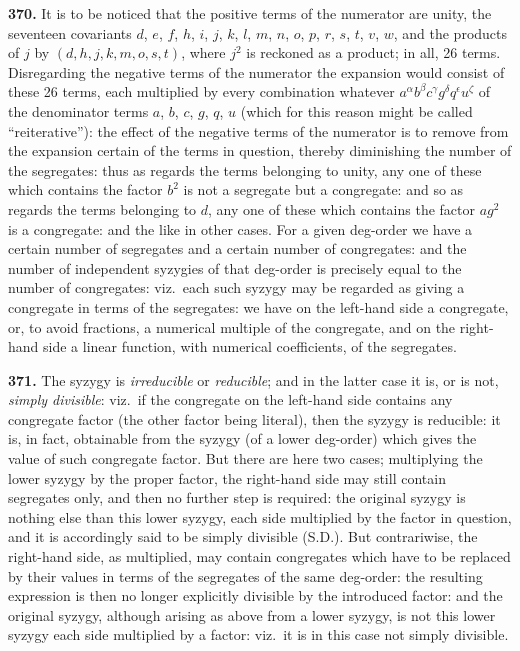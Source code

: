 \documentclass[11pt,a4paper]{book}
\begin{document}
\medskip

\noindent\textbf{370.} It is to be noticed that the positive terms of the numerator are unity, the seventeen covariants $d$, $e$, $f$, $h$, $i$, $j$, $k$, $l$, $m$, $n$, $o$, $p$, $r$, $s$, $t$, $v$, $w$, and the products of $j$ by $(d, h, j, k, m, o, s, t)$, where $j^2$ is reckoned as a product; in all, 26 terms. Disregarding the negative terms of the numerator the expansion would consist of these 26 terms, each multiplied by every combination whatever $a^\alpha b^\beta c^\gamma g^\delta q^\epsilon u^\zeta$ of the denominator terms $a$, $b$, $c$, $g$, $q$, $u$ (which for this reason might be called ``reiterative''): the effect of the negative terms of the numerator is to remove from the expansion certain of the terms in question, thereby diminishing the number of the segregates: thus as regards the terms belonging to unity, any one of these which contains the factor $b^2$ is not a segregate but a congregate: and so as regards the terms belonging to $d$, any one of these which contains the factor $ag^2$ is a congregate: and the like in other cases. For a given deg-order we have a certain number of segregates and a certain number of congregates: and the number of independent syzygies of that deg-order is precisely equal to the number of congregates: viz.\ each such syzygy may be regarded as giving a congregate in terms of the segregates: we have on the left-hand side a congregate, or, to avoid fractions, a numerical multiple of the congregate, and on the right-hand side a linear function, with numerical coefficients, of the segregates.

\medskip

\noindent\textbf{371.} The syzygy is \textit{irreducible} or \textit{reducible}; and in the latter case it is, or is not, \textit{simply divisible}: viz.\ if the congregate on the left-hand side contains any congregate factor (the other factor being literal), then the syzygy is reducible: it is, in fact, obtainable from the syzygy (of a lower deg-order) which gives the value of such congregate factor. But there are here two cases; multiplying the lower syzygy by the proper factor, the right-hand side may still contain segregates only, and then no further step is required: the original syzygy is nothing else than this lower syzygy, each side multiplied by the factor in question, and it is accordingly said to be simply divisible (S.D.). But contrariwise, the right-hand side, as multiplied, may contain congregates which have to be replaced by their values in terms of the segregates of the same deg-order: the resulting expression is then no longer explicitly divisible by the introduced factor: and the original syzygy, although arising as above from a lower syzygy, is not this lower syzygy each side multiplied by a factor: viz.\ it is in this case not simply divisible.
\end{document}
